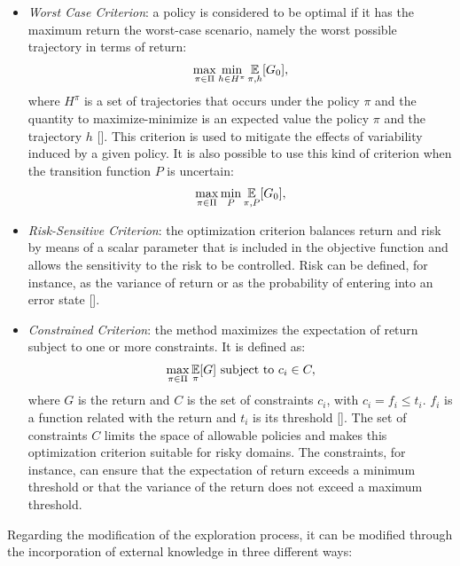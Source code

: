 \begin{itemize}
	\item \emph{Worst Case Criterion}: a policy is considered to be optimal if it has the maximum return \wrt the worst-case scenario, namely the worst possible trajectory in terms of return:
	\begin{align}
	\max_{\pi \in \Pi}\min_{h \in H^{\pi}} \operatorname*{\mathbb{E}}_{\pi, h}[G_{0}],
	\end{align}
	where $H^{\pi}$ is a set of trajectories that occurs under the policy $\pi$ and the quantity to maximize-minimize is an expected value \wrt the policy $\pi$ and the trajectory $h$ [\cite{Heger1994ConsiderationOR}]. This criterion is used to mitigate the effects of variability induced by a given policy. It is also possible to use this kind of criterion when the transition function $P$ is uncertain:
	\begin{align}
	\max_{\pi \in \Pi}\min_{P} \operatorname*{\mathbb{E}}_{\pi, P}[G_{0}],
	\end{align}
	\item \emph{Risk-Sensitive Criterion}: the optimization criterion balances return and risk by means of a scalar parameter that is included in the objective function and allows the sensitivity to the risk to be controlled. Risk can be defined, for instance, as the variance of return or as the probability of entering into an error state [\cite{Geibel2005RiskSensitiveRL}].
	\item \emph{Constrained Criterion}: the method maximizes the expectation of return subject to one or more constraints. It is defined as:
	\begin{align}
		\max_{\pi \in \Pi} \operatorname*{\mathbb{E}}_{\pi}[G] \text{ subject to }c_i \in C,
	\end{align}
	where $G$ is the return and $C$ is the set of constraints $c_i$, with $c_i = f_i \leq t_i$. $f_i$ is a function related with the return and $t_i$ is its threshold [\cite{moldovan2012safe}]. The set of constraints $C$ limits the space of allowable policies and makes this optimization criterion suitable for risky domains. The constraints, for instance, can ensure that the expectation of return exceeds a minimum threshold or that the variance of the return does not exceed a maximum threshold.
	
\end{itemize}
Regarding the modification of the exploration process, it can be modified through the incorporation of external knowledge in three different ways:
